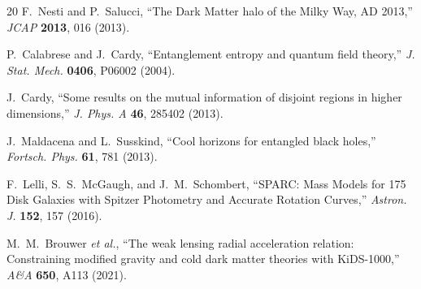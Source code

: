 \documentclass[12pt,a4paper]{article}
\begin{document}
\begin{thebibliography}{20}
F.~Nesti and P.~Salucci, ``The Dark Matter halo of the Milky Way, AD 2013,'' \emph{JCAP} \textbf{2013}, 016 (2013).

P.~Calabrese and J.~Cardy, ``Entanglement entropy and quantum field theory,'' \emph{J. Stat. Mech.} \textbf{0406}, P06002 (2004).

J.~Cardy, ``Some results on the mutual information of disjoint regions in higher dimensions,'' \emph{J. Phys. A} \textbf{46}, 285402 (2013).

J.~Maldacena and L.~Susskind, ``Cool horizons for entangled black holes,'' \emph{Fortsch. Phys.} \textbf{61}, 781 (2013).

F.~Lelli, S.~S.~McGaugh, and J.~M.~Schombert, ``SPARC: Mass Models for 175 Disk Galaxies with Spitzer Photometry and Accurate Rotation Curves,'' \emph{Astron. J.} \textbf{152}, 157 (2016).

M.~M.~Brouwer \emph{et al.}, ``The weak lensing radial acceleration relation: Constraining modified gravity and cold dark matter theories with KiDS-1000,'' \emph{A\&A} \textbf{650}, A113 (2021).

\end{thebibliography}
\end{document}
